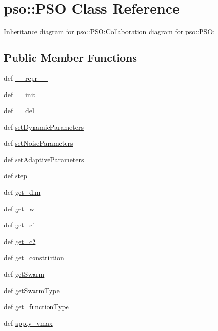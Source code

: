 \hypertarget{classpso_1_1PSO}{
\section{pso::PSO Class Reference}
\label{classpso_1_1PSO}
}
Inheritance diagram for pso::PSO:Collaboration diagram for pso::PSO:\subsection*{Public Member Functions}
\begin{CompactItemize}
\item 
def \hyperlink{classpso_1_1PSO_0225f828ac29fe3bb87a9a3be43dcc17}{\_\-\_\-repr\_\-\_\-}
\item 
def \hyperlink{classpso_1_1PSO_27a5c2096805e771388694c18aba01e0}{\_\-\_\-init\_\-\_\-}
\item 
def \hyperlink{classpso_1_1PSO_051b2a3a8d5cd4a513969e3158d1ff40}{\_\-\_\-del\_\-\_\-}
\item 
def \hyperlink{classpso_1_1PSO_fda65366f31eb6b6c534f95d5153d050}{setDynamicParameters}
\item 
def \hyperlink{classpso_1_1PSO_ebc90f7f5e25a1afe5ae032fefe575dd}{setNoiseParameters}
\item 
def \hyperlink{classpso_1_1PSO_d3ca64b7144ad5a3b4e3d6cc28be991c}{setAdaptiveParameters}
\item 
def \hyperlink{classpso_1_1PSO_b71a6d7ced88347ca2961cda8f9b4b77}{step}
\item 
def \hyperlink{classpso_1_1PSO_f8d0aa8bfb1f15498f5832c0258db0b8}{get\_\-dim}
\item 
def \hyperlink{classpso_1_1PSO_8f19a276b73ebed8eb60242ff4a200d8}{get\_\-w}
\item 
def \hyperlink{classpso_1_1PSO_d07dbd6d6702d60df2c6524919192fd5}{get\_\-c1}
\item 
def \hyperlink{classpso_1_1PSO_6f3f022962878070e1fc3b142bfce47d}{get\_\-c2}
\item 
def \hyperlink{classpso_1_1PSO_5b63828fd1e79c2f5945ab60b521f5d9}{get\_\-constriction}
\item 
def \hyperlink{classpso_1_1PSO_2515689bd9deee5e89a70685634a8c85}{getSwarm}
\item 
def \hyperlink{classpso_1_1PSO_e72f831eec0b36a9207740565209e65e}{getSwarmType}
\item 
def \hyperlink{classpso_1_1PSO_3b3dad7dbc84d2648a82ac8c4509941c}{get\_\-functionType}
\item 
def \hyperlink{classpso_1_1PSO_85bb1d9b5bc3cd3576d0d9b0985c43f8}{apply\_\-vmax}

\end{CompactItemize}
